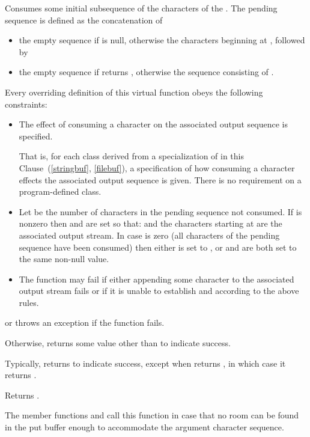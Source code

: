 \begin{itemdescr}  %
\pnum
\effects
Consumes some initial subsequence of the characters of the
.
The pending sequence is defined as the concatenation of
\begin{itemize}
\item
the empty sequence if  is null, otherwise the
characters beginning at
, followed by
\item
the empty sequence
if
returns
, otherwise the sequence consisting of .
\end{itemize}

\pnum
\expects
Every overriding definition of this virtual function
obeys the following constraints:
\begin{itemize}
\item
The effect of consuming a character on the associated output sequence is
specified.
\begin{footnote}
That is, for each class derived from a specialization of
in this Clause~(\ref{stringbuf},
\ref{filebuf}),
a specification of how consuming a character effects the associated output sequence is given.
There is no requirement on a program-defined class.
\end{footnote}
\item
Let
be the number of characters in the pending sequence not consumed.
If
is nonzero then
and
are set so that:
and the  characters starting at
are the associated output stream.
In case   is zero (all characters of the pending sequence have been consumed)
then either
is set to
,
or
and
are both set to the same non-null value.
\item
The function may fail if either
appending some character to the associated output stream fails or
if it is unable to establish
and
according to the above rules.
\end{itemize}

\pnum
\returns
{}
or throws an exception
if the function fails.

Otherwise,
returns some value other than
to indicate success.
\begin{footnote}
Typically,
returns  to indicate success, except when
returns
,
in which case it returns
.
\end{footnote}

\pnum
{}
Returns
.

\pnum
\remarks
The member functions
and
call this function in case that
no room can be found in the put buffer enough to accommodate the
argument character sequence.
\end{itemdescr}

